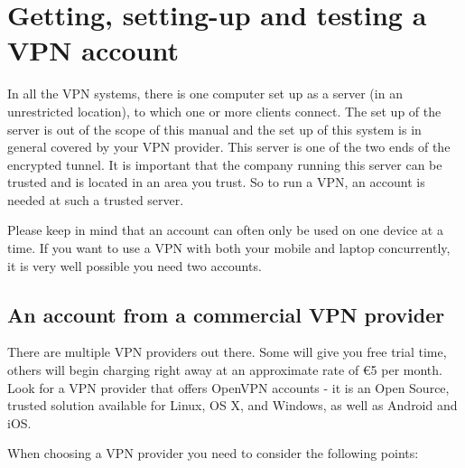 \section{Getting, setting-up and testing a VPN account}

In all the VPN systems, there is one computer set up as a server (in an
unrestricted location), to which one or more clients connect. The set up
of the server is out of the scope of this manual and the set up of this
system is in general covered by your VPN provider. This server is one of
the two ends of the encrypted tunnel. It is important that the company
running this server can be trusted and is located in an area you trust.
So to run a VPN, an account is needed at such a trusted server.

Please keep in mind that an account can often only be used on one device
at a time. If you want to use a VPN with both your mobile and laptop
concurrently, it is very well possible you need two accounts.

\subsection{An account from a commercial VPN provider}

There are multiple VPN providers out there. Some will give you free
trial time, others will begin charging right away at an approximate rate
of €5 per month. Look for a VPN provider that offers OpenVPN accounts -
it is an Open Source, trusted solution available for Linux, OS X, and
Windows, as well as Android and iOS.

When choosing a VPN provider you need to consider the following points:

